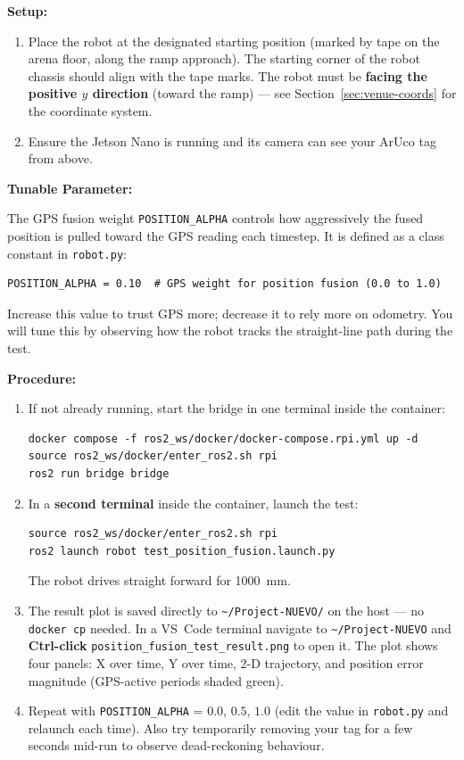 \documentclass[12pt,letterpaper]{article}
\begin{document}
\textbf{Setup:}
\begin{enumerate}
  \item Place the robot at the designated starting position
        (marked by tape on the arena floor, along the ramp approach).
        The starting corner of the robot chassis should align with the tape
        marks.  The robot must be \textbf{facing the positive $y$ direction}
        (toward the ramp) --- see Section~\ref{sec:venue-coords} for the
        coordinate system.
  \item Ensure the Jetson Nano is running and its camera can see your ArUco
        tag from above.
\end{enumerate}

\textbf{Tunable Parameter:}

The GPS fusion weight \texttt{POSITION\_ALPHA} controls how aggressively the
fused position is pulled toward the GPS reading each timestep.
It is defined as a class constant in \texttt{robot.py}:
\begin{lstlisting}[style=python, caption={POSITION\_ALPHA in robot.py}]
POSITION_ALPHA = 0.10  # GPS weight for position fusion (0.0 to 1.0)
\end{lstlisting}
Increase this value to trust GPS more; decrease it to rely more on odometry.
You will tune this by observing how the robot tracks the straight-line path
during the test.

\textbf{Procedure:}
\begin{enumerate}
  \item If not already running, start the bridge in one terminal inside the
        container:
\begin{lstlisting}[style=bash]
docker compose -f ros2_ws/docker/docker-compose.rpi.yml up -d
source ros2_ws/docker/enter_ros2.sh rpi
ros2 run bridge bridge
\end{lstlisting}
  \item In a \textbf{second terminal} inside the container, launch the test:
\begin{lstlisting}[style=bash]
source ros2_ws/docker/enter_ros2.sh rpi
ros2 launch robot test_position_fusion.launch.py
\end{lstlisting}
        The robot drives straight forward for 1000~mm.
  \item The result plot is saved directly to \texttt{\textasciitilde/Project-NUEVO/}
        on the host --- no \texttt{docker cp} needed.
        In a VS~Code terminal navigate to \texttt{\textasciitilde/Project-NUEVO}
        and \textbf{Ctrl-click}
        \texttt{position\_fusion\_test\_result.png} to open it.
        The plot shows four panels: X over time, Y over time, 2-D trajectory,
        and position error magnitude (GPS-active periods shaded green).
  \item Repeat with \texttt{POSITION\_ALPHA} = $0.0$, $0.5$, $1.0$ (edit the
        value in \texttt{robot.py} and relaunch each time).
        Also try temporarily removing your tag for a
        few seconds mid-run to observe dead-reckoning behaviour.
\end{enumerate}
\end{document}
